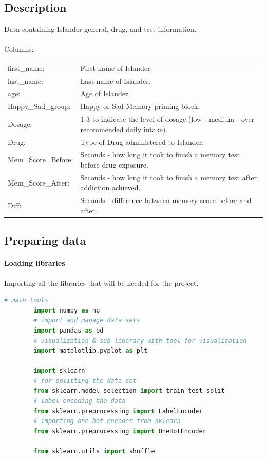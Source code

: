 \documentclass{article}
\begin{document}
    \subsection{Description}
    Data containing Islander general, drug, and test information.\\
    \\
    Columns:\\
    \begin{longtable}{ l p{3in} }
        first_name: & First name of Islander.\\
        last_name: & Last name of Islander.\\
        age: & Age of Islander.\\
        Happy_Sad_group: & Happy or Sad Memory priming block.\\
        Dosage: & 1-3 to indicate the level of dosage (low - medium - over recommended daily intake).\\
        Drug: & Type of Drug administered to Islander.\\
        Mem_Score_Before: & Seconds - how long it took to finish a memory test before drug exposure.\\
        Mem_Score_After: & Seconds - how long it took to finish a memory test after addiction achieved.\\
        Diff: & Seconds - difference between memory score before and after.\\
    \end{longtable}
    \subsection{Preparing data}
    \paragraph{Loading libraries}
    Importing all the libraries that will be needed for the project.
    \begin{lstlisting}[language=Python]
        # math tools
        import numpy as np
        # import and manage data sets
        import pandas as pd
        # visualization & sub libarary with tool for visualization
        import matplotlib.pyplot as plt

        import sklearn
        # for splitting the data set
        from sklearn.model_selection import train_test_split
        # label encoding the data
        from sklearn.preprocessing import LabelEncoder
        # importing one hot encoder from sklearn
        from sklearn.preprocessing import OneHotEncoder

        from sklearn.utils import shuffle
    \end{lstlisting}
    \newpage
\end{document}
